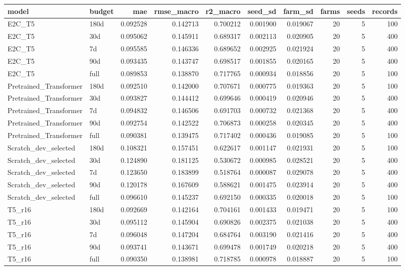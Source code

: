 \begin{tabular}{llrrrrrrrr}
\toprule
model & budget & mae & rmse\_macro & r2\_macro & seed\_sd & farm\_sd & farms & seeds & records \\
\midrule
E2C\_T5 & 180d & 0.092528 & 0.142713 & 0.700212 & 0.001900 & 0.019067 & 20 & 5 & 100 \\
E2C\_T5 & 30d & 0.095062 & 0.145911 & 0.689317 & 0.002113 & 0.020905 & 20 & 5 & 400 \\
E2C\_T5 & 7d & 0.095585 & 0.146336 & 0.689652 & 0.002925 & 0.021924 & 20 & 5 & 400 \\
E2C\_T5 & 90d & 0.093435 & 0.143747 & 0.698517 & 0.001855 & 0.020165 & 20 & 5 & 400 \\
E2C\_T5 & full & 0.089853 & 0.138870 & 0.717765 & 0.000934 & 0.018856 & 20 & 5 & 100 \\
Pretrained\_Transformer & 180d & 0.092510 & 0.142000 & 0.707671 & 0.000775 & 0.019363 & 20 & 5 & 100 \\
Pretrained\_Transformer & 30d & 0.093827 & 0.144412 & 0.699646 & 0.000419 & 0.020946 & 20 & 5 & 400 \\
Pretrained\_Transformer & 7d & 0.094832 & 0.146506 & 0.691703 & 0.000732 & 0.021368 & 20 & 5 & 400 \\
Pretrained\_Transformer & 90d & 0.092754 & 0.142522 & 0.706873 & 0.000258 & 0.020345 & 20 & 5 & 400 \\
Pretrained\_Transformer & full & 0.090381 & 0.139475 & 0.717402 & 0.000436 & 0.019085 & 20 & 5 & 100 \\
Scratch\_dev\_selected & 180d & 0.108321 & 0.157451 & 0.622617 & 0.001147 & 0.021931 & 20 & 5 & 100 \\
Scratch\_dev\_selected & 30d & 0.124890 & 0.181125 & 0.530672 & 0.000985 & 0.028521 & 20 & 5 & 400 \\
Scratch\_dev\_selected & 7d & 0.123650 & 0.183899 & 0.518764 & 0.000087 & 0.029078 & 20 & 5 & 400 \\
Scratch\_dev\_selected & 90d & 0.120178 & 0.167609 & 0.588621 & 0.001475 & 0.023914 & 20 & 5 & 400 \\
Scratch\_dev\_selected & full & 0.096610 & 0.145237 & 0.692150 & 0.000335 & 0.020018 & 20 & 5 & 100 \\
T5\_r16 & 180d & 0.092669 & 0.142164 & 0.704161 & 0.001433 & 0.019471 & 20 & 5 & 100 \\
T5\_r16 & 30d & 0.095112 & 0.145904 & 0.690826 & 0.002375 & 0.021038 & 20 & 5 & 400 \\
T5\_r16 & 7d & 0.096048 & 0.147204 & 0.684764 & 0.003190 & 0.021416 & 20 & 5 & 400 \\
T5\_r16 & 90d & 0.093741 & 0.143671 & 0.699478 & 0.001749 & 0.020218 & 20 & 5 & 400 \\
T5\_r16 & full & 0.090350 & 0.138981 & 0.718785 & 0.000978 & 0.018887 & 20 & 5 & 100 \\
\bottomrule
\end{tabular}

